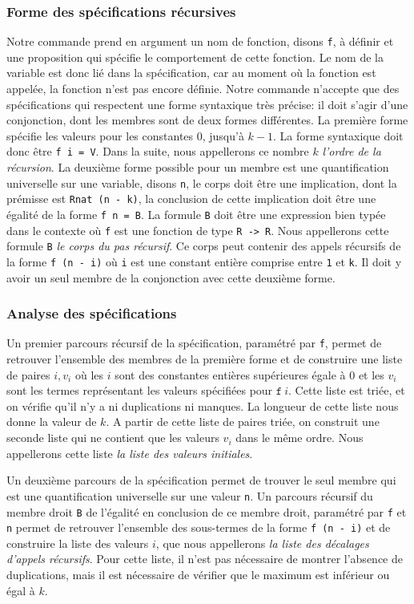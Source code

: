 \documentclass[draft]{jflart}
\begin{document}
\subsubsection{Forme des spécifications récursives}
Notre commande prend en argument un nom de fonction, disons \texttt{f},
à définir et une
proposition qui spécifie le comportement de cette fonction.  Le nom de
la variable est donc lié dans la spécification, car au moment où la
fonction est appelée, la fonction n'est pas encore définie.  Notre
commande n'accepte que des spécifications qui respectent une forme
syntaxique très précise: il doit s'agir d'une conjonction, dont les
membres sont de deux formes différentes.  La première forme spécifie
les valeurs pour les constantes \(0\), jusqu'à \(k - 1\).  La forme
syntaxique doit donc être \texttt{f i = V}.  Dans la suite, nous
appellerons ce nombre \(k\) {\em l'ordre de la récursion}.
La deuxième forme possible
pour un membre est une quantification universelle sur une variable,
disons \texttt{n}, le corps doit être une implication, dont la prémisse
est \texttt{Rnat (n - k)}, la conclusion de cette implication doit être
une égalité de la forme \texttt{f n = B}.  La formule \texttt{B} doit être
une expression bien typée dans le contexte où \texttt{f} est une fonction
de type \texttt{R -> R}.  Nous appellerons cette formule \texttt{B} {\em le
  corps du pas récursif}.
Ce corps peut contenir des appels récursifs de
la forme \texttt{f (n - i)} où \texttt{i} est une constant entière comprise
  entre \texttt{1} et \texttt{k}.  Il doit y avoir un seul membre de la
  conjonction avec cette deuxième forme.

\subsubsection{Analyse des spécifications}
Un premier parcours récursif de la spécification, paramétré par
\texttt{f}, permet de retrouver l'ensemble des membres de la première forme
et de construire une liste de paires \(i, v_i\) où les \(i\) sont des
constantes entières supérieures égale à 0 et les \(v_i\) sont les
termes représentant les valeurs spécifiées pour \(\texttt{f}~i\).  Cette
liste est triée, et on vérifie qu'il n'y a ni duplications ni manques.
La longueur de cette liste nous donne la valeur de \(k\).  A partir
de cette liste de paires triée, on construit une seconde liste qui ne
contient que les valeurs \(v_i\) dans le même ordre.  Nous appellerons
cette liste {\em la liste des valeurs initiales}.

Un deuxième parcours de la spécification permet de trouver le seul
membre qui est une quantification universelle sur une valeur \texttt{n}.
Un parcours récursif du membre droit \texttt{B} de l'égalité en conclusion de
ce membre droit, paramétré par \texttt{f} et \texttt{n}  permet de retrouver
l'ensemble des sous-termes de la forme \texttt{f (n - i)} et de
construire la liste des valeurs \(i\), que nous appellerons {\em la liste des
décalages d'appels récursifs}.  Pour cette liste, il n'est
pas nécessaire de montrer l'absence de duplications, mais il est
nécessaire de vérifier que le maximum est inférieur ou égal à \(k\).
\end{document}
